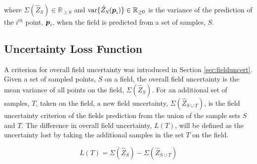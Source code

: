 \noindent where $\Sigma(\hat{Z}_{S}) \in \mathbb{R}_{\geq 0}$ and $\text{var}\{\hat{Z}_{S}({\it{\boldsymbol{p}}}_i)\} \in \mathbb{R}_{\geq 0}$ is the variance of the prediction of the $i^{th}$ point, ${\it{\boldsymbol{p}}}_i$, when the field is predicted from a set of samples, $S$.

\subsection{Uncertainty Loss Function} \label{sec:lossfunc}
A criterion for overall field uncertainty was introduced in Section \ref{sec:fielduncert}. Given a set of sampled points, $S$ on a field, the overall field uncertainty is the mean variance of all points on the field, $\Sigma(\hat{Z}_{S})$. For an additional set of samples, $T$, taken on the field, a new field uncertainty, $\Sigma(\hat{Z}_{S \cup T})$, is the field uncertainty criterion of the fields prediction from the union of the sample sets $S$ and $T$. The difference in overall field uncertainty, $L(T)$, will be defined as the uncertainty lost by taking the additional samples in the set $T$ on the field.

\begin{equation}
	L(T) = \Sigma(\hat{Z}_{S}) - \Sigma(\hat{Z}_{S \cup T})
	\label{eq:lossfunc}
\end{equation}





